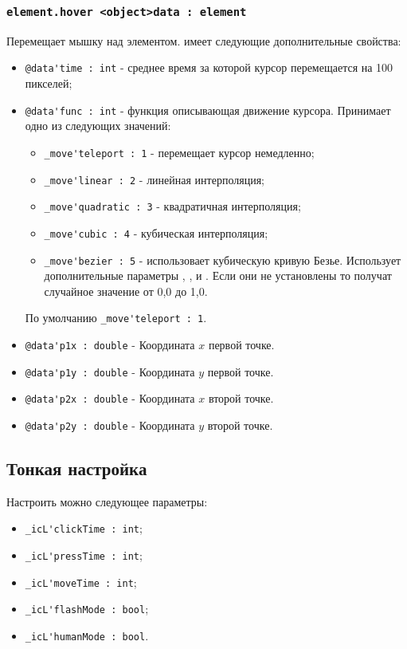 \documentclass[a4paper, 14pt]{extarticle}
\newenvironment{icItems}
	{ \begin{itemize} [noitemsep,nolistsep] }
	{ \end{itemize} }
\begin{document}
\subsubsection{\lstinline|element.hover <object>data : element|}

Перемещает мышку над элементом.  имеет следующие дополнительные свойства:
\begin{icItems}
	\item \lstinline|@data'time : int| - среднее время за которой курсор перемещается на 100 пикселей;
	\item \lstinline|@data'func : int| - функция описывающая движение курсора. Принимает одно из следующих значений:
	\begin{icItems}
		\item \lstinline|_move'teleport : 1| - перемещает курсор немедленно;
		\item \lstinline|_move'linear : 2| - линейная интерполяция;
		\item \lstinline|_move'quadratic : 3| - квадратичная интерполяция;
		\item \lstinline|_move'cubic : 4| - кубическая интерполяция;
		\item \lstinline|_move'bezier : 5| - использовает кубическую кривую Безье. Использует дополнительные параметры , ,  и . Если они не установлены то получат случайное значение от 0,0 до 1,0.
	\end{icItems}
	По умолчанию \lstinline|_move'teleport : 1|.
	\item \lstinline|@data'p1x : double| - Координата $x$ первой точке.
	\item \lstinline|@data'p1y : double| - Координата $y$ первой точке.
	\item \lstinline|@data'p2x : double| - Координата $x$ второй точке.
	\item \lstinline|@data'p2y : double| - Координата $y$ второй точке.
\end{icItems}

\subsection{Тонкая настройка}

Настроить можно следующее параметры:
\begin{icItems}
	\item \lstinline|_icL'clickTime : int|;
	\item \lstinline|_icL'pressTime : int|;
	\item \lstinline|_icL'moveTime : int|;
	\item \lstinline|_icL'flashMode : bool|;
	\item \lstinline|_icL'humanMode : bool|.
\end{icItems}
\end{document}
